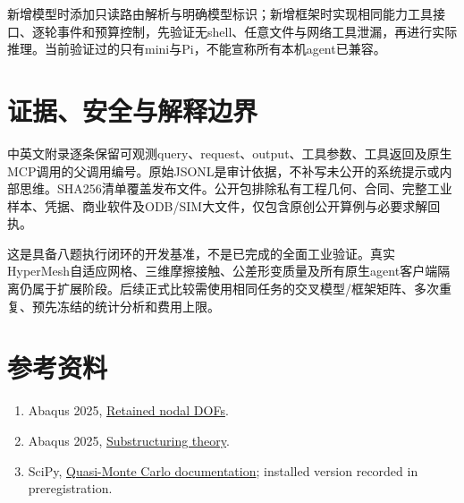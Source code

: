 \documentclass[UTF8,a4paper,11pt,fontset=windows]{ctexart}
\begin{document}
新增模型时添加只读路由解析与明确模型标识；新增框架时实现相同能力工具接口、逐轮事件和预算控制，先验证无shell、任意文件与网络工具泄漏，再进行实际推理。当前验证过的只有mini与Pi，不能宣称所有本机agent已兼容。

\section{证据、安全与解释边界}

中英文附录逐条保留可观测query、request、output、工具参数、工具返回及原生MCP调用的父调用编号。原始JSONL是审计依据，不补写未公开的系统提示或内部思维。SHA256清单覆盖发布文件。公开包排除私有工程几何、合同、完整工业样本、凭据、商业软件及ODB/SIM大文件，仅包含原创公开算例与必要求解回执。

这是具备八题执行闭环的开发基准，不是已完成的全面工业验证。真实HyperMesh自适应网格、三维摩擦接触、公差形变质量及所有原生agent客户端隔离仍属于扩展阶段。后续正式比较需使用相同任务的交叉模型/框架矩阵、多次重复、预先冻结的统计分析和费用上限。

\section*{参考资料}

\begin{enumerate}\item Abaqus 2025, \href{https://docs.software.vt.edu/abaqusv2025/English/SIMACAEKEYRefMap/simakey-r-retainednodaldofs.htm}{Retained nodal DOFs}.

\item Abaqus 2025, \href{https://docs.software.vt.edu/abaqusv2025/English/SIMACAETHERefMap/simathe-c-superelements.htm}{Substructuring theory}.

\item SciPy, \href{https://docs.scipy.org/doc/scipy/reference/stats.qmc.html}{Quasi-Monte Carlo documentation}; installed version recorded in preregistration.\end{enumerate}
\end{document}
